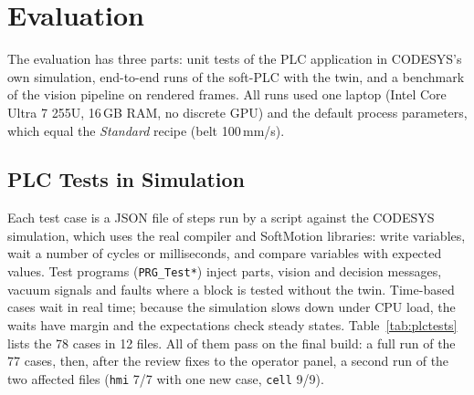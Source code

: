 \section{Evaluation}\label{sec:evaluation}

The evaluation has three parts: unit tests of the PLC application in CODESYS's own simulation,
end-to-end runs of the soft-PLC with the twin, and a benchmark of the vision pipeline on rendered
frames. All runs used one laptop (Intel Core Ultra 7 255U, 16\,GB RAM, no discrete GPU) and the
default process parameters, which equal the \emph{Standard} recipe (belt 100\,mm/s).

\subsection{PLC Tests in Simulation}

Each test case is a JSON file of steps run by a script against the CODESYS simulation, which
uses the real compiler and SoftMotion libraries: write variables, wait a number of cycles or
milliseconds, and compare variables with expected values. Test programs (\texttt{PRG\_Test*})
inject parts, vision and decision messages, vacuum signals and faults where a block is tested
without the twin. Time-based cases wait in real time; because the simulation slows down under CPU
load, the waits have margin and the expectations check steady states. Table~\ref{tab:plctests}
lists the 78 cases in 12 files. All of them pass on the final build: a full run of the
77 cases, then, after the review fixes to the operator panel, a second run of the two affected
files (\texttt{hmi} 7/7 with one new case, \texttt{cell} 9/9).

